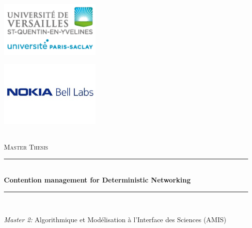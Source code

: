 \documentclass[a4paper,10pt]{report}
\newcommand{\reporttitle}{Contention management for Deterministic Networking}     %
\newcommand{\reportsubject}{Master Thesis}
\newcommand{\HRule}{\rule{\linewidth}{0.5mm}}
\begin{document}
\begin{titlepage}

\begin{center}



\begin{minipage}[t]{0.48\textwidth}
  \begin{flushleft} \large
       \includegraphics [width=50mm]{logo.png} \\[0.5cm]
  \end{flushleft}
\end{minipage}
\begin{minipage}[t]{0.48\textwidth}
  \begin{flushright} \large
    \includegraphics [width=50mm]{logon.png} \\[0.5cm]
  \end{flushright}
\end{minipage}
 \\[3cm]

\textsc{\Large \reportsubject}\\[0.5cm]
\HRule \\[0.4cm]
{\huge \bfseries \reporttitle}\\[0.4cm]
\HRule \\[1.5cm]

\begin{minipage}[t]{1.0\textwidth}
  \begin{center} \large
    \emph{Master 2:} 
   Algorithmique et Modélisation à l'Interface des Sciences (AMIS) \\

  \end{center}
  \end{minipage}
  \\[3cm]
 

\end{center}
\end{titlepage}
\end{document}

